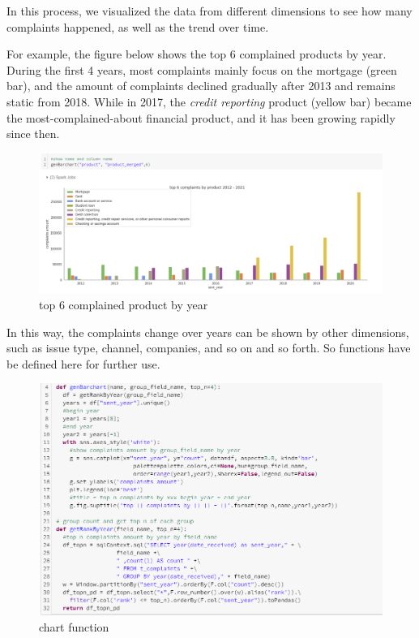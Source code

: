 \documentclass[conference]{IEEEtran}
\begin{document}
In this process, we visualized the data from different dimensions to see how many complaints happened, as well as the trend over time.

For example, the figure below shows the top 6 complained products by year. During the first 4 years, most complaints mainly focus on the mortgage (green bar), and the amount of complaints declined gradually after 2013 and remains static from 2018. While in 2017, the \textit{credit reporting} product (yellow bar) became the most-complained-about financial product, and it has been growing rapidly since then. 


\begin{figure}[h]
\centering
\includegraphics[width=1\linewidth]{img/byproduct.png}
\caption{top 6 complained product by year} \label{fig:xxxxx}
\end{figure} 


In this way, the complaints change over years can be shown by other dimensions, such as issue type, channel, companies, and so on and so forth. So functions have be defined here for further use.

\begin{figure}[h]
\centering
\includegraphics[width=1\linewidth]{img/chartfunction.png}
\caption{chart function} \label{fig:chartfunction}
\end{figure} 
\end{document}
